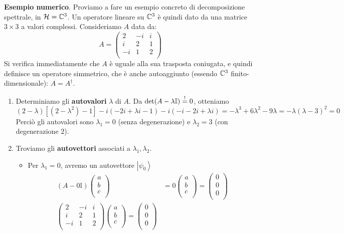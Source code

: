 \textbf{Esempio numerico}. 
Proviamo a fare un esempio concreto di decomposizione spettrale, in $\mathcal{H} = \mathbb{C}^3$. Un operatore lineare su $\mathbb{C}^3$ è quindi dato da una matrice $3\times 3$ a valori complessi. Consideriamo $A$ data da:
\[
A=\left(\begin{matrix}2&-i&i\\i&2&1\\-i&1&2\\\end{matrix}\right) 
\]
Si verifica immediatamente che $A$ è uguale alla sua trasposta coniugata, e quindi definisce un operatore simmetrico, che è anche autoaggiunto (essendo $\mathbb{C}^3$ finito-dimensionale): $A = A^\dag$.\\
\begin{enumerate}
    \item Determiniamo gli \textbf{autovalori} $\lambda$ di $A$. Da $\operatorname{det}(A-\lambda \mathbb{I}) \overset{!}{=} 0$, otteniamo
    $
    (2-\lambda)[(2-\lambda^2)-1]-i(-2i+\lambda i -1)-i(-i -2i +\lambda i) = -\lambda^3 + 6\lambda^2 - 9\lambda = -\lambda(\lambda -3)^2 = 0$\\
    Perciò gli autovalori sono $\lambda_1 = 0$ (senza degenerazione) e $\lambda_2 = 3$ (con degenerazione $2$).\\
    \item Troviamo gli \textbf{autovettori} associati a $\lambda_1, \lambda_2$.
    \begin{itemize}
    \item Per $\lambda_1 =0$, avremo un autovettore $\left|\psi_0\right\rangle$
	\begin{align*}
	\left(A-0\mathbb{I}\right)\left(\begin{matrix}a\\b\\c\\\end{matrix}\right)&=0\left(\begin{matrix}a\\b\\c\\\end{matrix}\right)=\left(\begin{matrix}0\\0\\0\\\end{matrix}\right)\\
	\left(\begin{matrix}2&-i&i\\i&2&1\\-i&1&2\\\end{matrix}\right)\left(\begin{matrix}a\\b\\c\\\end{matrix}\right)=\left(\begin{matrix}0\\0\\0\\\end{matrix}\right)

\end{align*}
\end{itemize}
\end{enumerate}
